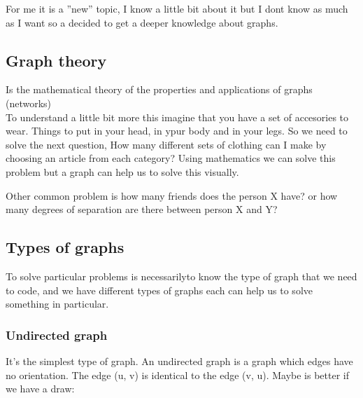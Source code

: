 For me it is a ''new'' topic, I know a little bit about it but I dont know as much as I want so a decided to get a deeper knowledge about graphs.

\subsection{Graph theory}
Is the mathematical theory of the properties and applications of graphs (networks)\\

To understand a little bit more this imagine that you have a set of accesories to wear. Things to put in your head, in ypur body and in your legs. So we need to solve the next question, How many different sets of clothing can I make by choosing an article from each category? Using mathematics we can solve this problem but a graph can help us to solve this visually.

Other common problem is how many friends does the person X have? or how many degrees of separation are there between person X and Y?

\subsection{Types of graphs}

To solve particular problems is necessarilyto know the type of graph that we need to code, and we have different types of graphs each can help us to solve something in particular.

\subsubsection{Undirected graph}
It's the simplest type of graph. An undirected graph is a graph which edges have no orientation. The edge (u, v) is identical to the edge (v, u). Maybe is better if we have a draw:


